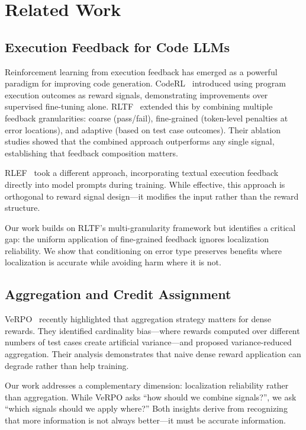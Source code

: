 \section{Related Work}

\subsection{Execution Feedback for Code LLMs}

Reinforcement learning from execution feedback has emerged as a powerful paradigm for improving code generation. CodeRL~\cite{le2022coderl} introduced using program execution outcomes as reward signals, demonstrating improvements over supervised fine-tuning alone. RLTF~\cite{liu2023rltf} extended this by combining multiple feedback granularities: coarse (pass/fail), fine-grained (token-level penalties at error locations), and adaptive (based on test case outcomes). Their ablation studies showed that the combined approach outperforms any single signal, establishing that feedback composition matters.

RLEF~\cite{gehring2024rlef} took a different approach, incorporating textual execution feedback directly into model prompts during training. While effective, this approach is orthogonal to reward signal design---it modifies the input rather than the reward structure.

Our work builds on RLTF's multi-granularity framework but identifies a critical gap: the uniform application of fine-grained feedback ignores localization reliability. We show that conditioning on error type preserves benefits where localization is accurate while avoiding harm where it is not.

\subsection{Aggregation and Credit Assignment}

VeRPO~\cite{wang2026verpo} recently highlighted that aggregation strategy matters for dense rewards. They identified cardinality bias---where rewards computed over different numbers of test cases create artificial variance---and proposed variance-reduced aggregation. Their analysis demonstrates that naive dense reward application can degrade rather than help training.

Our work addresses a complementary dimension: localization reliability rather than aggregation. While VeRPO asks ``how should we combine signals?'', we ask ``which signals should we apply where?'' Both insights derive from recognizing that more information is not always better---it must be accurate information.

